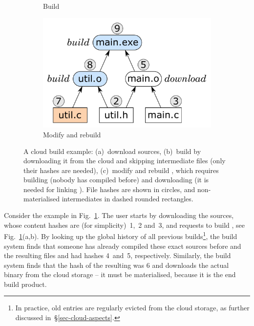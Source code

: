 \begin{figure}
\begin{subfigure}[b]{0.40\linewidth}
\caption{Build }
\end{subfigure}
\begin{subfigure}[b]{0.31\linewidth}
\centerline{\includegraphics[scale=0.28]{fig/bazel-example-rebuild.pdf}}
\caption{Modify  and rebuild}
\end{subfigure}
\caption{A cloud build example: (a)~download sources, (b)~build 
by downloading it from the cloud and skipping intermediate files (only their
hashes are needed), (c)~modify  and rebuild , which
requires building  (nobody has compiled  before) and
downloading  (it is needed for linking ). File hashes
are shown in circles, and non-materialised intermediates in dashed rounded
rectangles.\label{fig-bazel}}
\end{figure}

Consider the example in Fig.~\ref{fig-bazel}. The user starts by downloading the
sources, whose content hashes are (for simplicity)~1,~2 and~3, and requests to
build , see Fig.~\ref{fig-bazel}(a,b). By looking up the global
history of all previous builds\footnote{In practice, old entries are regularly
evicted from the cloud storage, as further discussed
in~\S\ref{sec-cloud-aspects}.}, the build system finds that someone has already
compiled these exact sources before and the resulting files  and
 had hashes 4~and~5, respectively. Similarly, the build system finds
that the hash of the resulting  was 6 and downloads the actual
binary from the cloud storage -- it must be materialised, because it is the end
build product.

